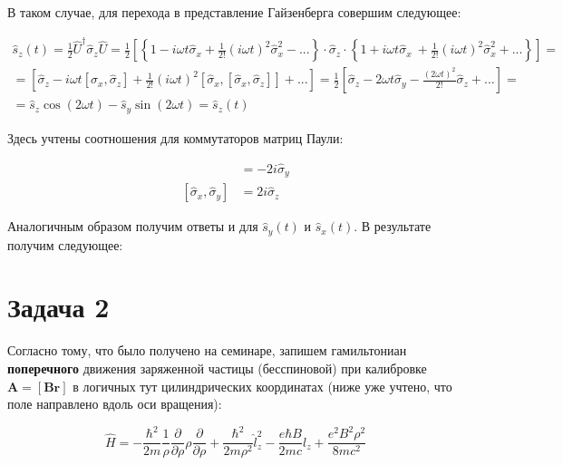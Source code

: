 \documentclass[a4paper, 12pt]{article}
\newcommand*\widefbox[1]{\fbox{\hspace{2em}#1\hspace{2em}}}
\begin{document}
В таком случае, для перехода в представление Гайзенберга совершим следующее:

\begin{align*}
	\hat{s}_z(t) = \frac{1}{2} \hat{U}^\dagger \hat{\sigma}_z \hat{U} = 
	\frac{1}{2} \left[\left\{1 - i\omega t \hat{\sigma}_x + \frac{1}{2!}(i \omega t)^2 \hat{\sigma}_x^2 - ...\right\} \cdot \hat{\sigma}_z \cdot \left\{1 + i\omega t \hat{\sigma}_x\ + \frac{1}{2!}(i \omega t)^2 \hat{\sigma}_x^2 + ...\right\} \right] = \\
	= \left[\hat{\sigma}_z - i\omega t [\hat{\sigma}_x,\hat{\sigma}_z] + \frac{1}{2!} (i\omega t)^2 [\hat{\sigma}_x, [\hat{\sigma}_x, \hat{\sigma}_z]] + ... \right] = 
	\frac{1}{2} \left[\hat{\sigma}_z - 2 \omega t \hat{\sigma}_y - \frac{(2\omega t)^2}{2!} \hat{\sigma}_z + ... \right] = \\
	= \boxed{\hat{s}_z \cos\left(2\omega t\right) - \hat{s}_y \sin\left(2 \omega t\right) = \hat{s}_z(t)}
\end{align*} 

Здесь учтены соотношения для коммутаторов матриц Паули:

\begin{align*}
	[\hat{\sigma}_x, \hat{\sigma}_z] &= - 2 i \hat{\sigma}_y\\
	[\hat{\sigma}_x, \hat{\sigma}_y] &= 2 i \hat{\sigma}_z
\end{align*}

Аналогичным образом получим ответы и для $\hat{s}_y(t)$ и $\hat{s}_x(t)$. В результате получим следующее:


\section*{Задача 2}

Согласно тому, что было получено на семинаре, запишем гамильтониан \textbf{поперечного} движения заряженной частицы (бесспиновой) при калибровке $\mathbf{A} = [\mathbf{B}\mathbf{r}]$ в логичных тут цилиндрических координатах (ниже уже учтено, что поле направлено вдоль оси вращения):

\begin{equation*}
	\hat{H} = - \frac{\hbar^2}{2 m} \frac{1}{\rho}\frac{\partial}{\partial \rho} \rho \frac{\partial}{\partial \rho} + \frac{\hbar^2}{2 m \rho^2} \hat{l}^2_z - \frac{e \hbar B}{2 m c} l_z + \frac{e^2 B^2 \rho^2}{8 m c^2}
\end{equation*}
\end{document}
